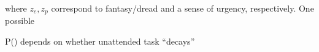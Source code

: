 where \(z_e, z_p\) correspond to fantasy/dread and a sense of urgency,
respectively. One possible

P() depends on whether unattended task ``decays''

\begin{figure}

\begin{minipage}[t]{0.50\linewidth}

{\centering 


}

\end{minipage}%
%
\begin{minipage}[t]{0.50\linewidth}

{\centering 

\raisebox{-\height}{

}}
\end{minipage}
\end{figure}
